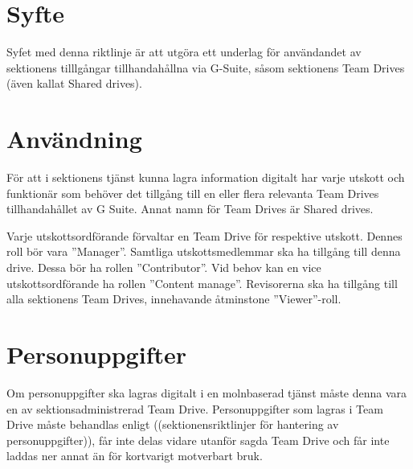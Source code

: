 \documentclass[10pt]{article}
\begin{document}
    \section*{\doctitle}
    \section{Syfte}
    
    Syfet med denna riktlinje är att utgöra ett underlag för användandet av sektionens tilllgångar tillhandahållna via G-Suite, såsom sektionens Team Drives (även kallat Shared drives).
    
    \section{Användning}
    För att i sektionens tjänst kunna lagra information digitalt har varje utskott och funktionär som behöver det tillgång till en eller flera relevanta Team Drives tillhandahållet av G Suite. Annat namn för Team Drives är Shared drives.
    
    Varje utskottsordförande förvaltar en Team Drive för respektive utskott. Dennes roll bör vara ''Manager''. Samtliga utskottsmedlemmar ska ha tillgång till denna drive. Dessa bör ha rollen ''Contributor''. 
    Vid behov kan en vice utskottsordförande ha rollen ''Content manage''. Revisorerna ska ha tillgång till alla sektionens Team Drives, innehavande åtminstone ''Viewer''-roll.
    
    \section{Personuppgifter}
    Om personuppgifter ska lagras digitalt i en molnbaserad tjänst måste denna vara en av sektionsadministrerad Team Drive. 
    Personuppgifter som lagras i Team Drive måste behandlas enligt ((sektionensriktlinjer för hantering av personuppgifter)), får inte delas vidare utanför sagda Team Drive och får inte laddas ner annat än för kortvarigt motverbart bruk.
\end{document}
